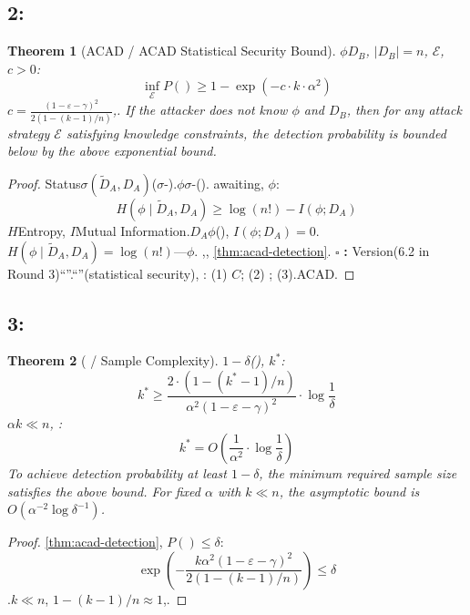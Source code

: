 \documentclass[11pt,a4paper]{article}
\theoremstyle{plain}
\newtheorem{theorem}{Theorem}[section]
\theoremstyle{definition}
\theoremstyle{remark}
\begin{document}
{\subsection{2:}
\begin{theorem}[ACAD / ACAD Statistical Security Bound]
\label{thm:acad-security}
$\phi$$D_B$, $|D_B| = n$, $\mathcal{E}$, $c > 0$: 
\begin{equation}
\boxed{\inf_{\mathcal{E}} P(\text{}) \geq 1 - \exp\left(-c \cdot k \cdot \alpha^2\right)}
\end{equation}
$c = \frac{(1 - \varepsilon - \gamma)^2}{2(1 - (k-1)/n)}$,.
\textit{If the attacker does not know $\phi$ and $D_B$, then for any attack strategy $\mathcal{E}$ satisfying knowledge constraints, the detection probability is bounded below by the above exponential bound.}
\end{theorem}
\begin{proof}
Status$\sigma(\tilde{D}_A, D_A)$($\sigma$-).$\phi$$\sigma$-().
awaiting, $\phi$: 
\begin{equation}
 H(\phi \mid \tilde{D}_A, D_A) \geq \log(n!) - I(\phi; D_A)
\end{equation}
$H$Entropy, $I$Mutual Information.$D_A$$\phi$(), $I(\phi; D_A) = 0$.$H(\phi \mid \tilde{D}_A, D_A) = \log(n!)$---$\phi$.
,, \ref{thm:acad-detection}.
$\square$ \textbf{: } Version(6.2 in Round 3)``''.``''(statistical security), : (1) $C$; (2) ; (3).ACAD.
\end{proof}
\subsection{3:}
\begin{theorem}[ / Sample Complexity]
\label{thm:acad-sample}
$1 - \delta$(), $k^*$: 
\begin{equation}
\boxed{k^* \geq \frac{2 \cdot (1 - (k^*-1)/n)}{\alpha^2 (1 - \varepsilon - \gamma)^2} \cdot \log\frac{1}{\delta}}
\end{equation}
$\alpha$$k \ll n$, : 
\begin{equation}
k^* = O\left(\frac{1}{\alpha^2} \cdot \log\frac{1}{\delta}\right)
\end{equation}
\textit{To achieve detection probability at least $1-\delta$, the minimum required sample size satisfies the above bound. For fixed $\alpha$ with $k \ll n$, the asymptotic bound is $O(\alpha^{-2} \log \delta^{-1})$.}
\end{theorem}
\begin{proof}
\ref{thm:acad-detection}, $P(\text{}) \leq \delta$: 
\begin{equation}
 \exp\left(-\frac{k \alpha^2 (1 - \varepsilon - \gamma)^2}{2(1 - (k-1)/n)}\right) \leq \delta
\end{equation}
.$k \ll n$, $1 - (k-1)/n \approx 1$,.
\end{proof}
}
\end{document}
